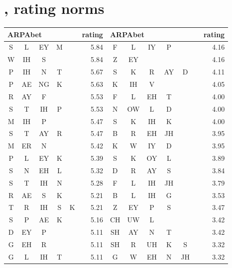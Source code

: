 \section{\citet{Albright2003b}, rating norms}

\begin{center}
\begin{longtable}{c@{ } c@{ } c@{ } c@{ } c r | c@{ } c@{ } c@{ } c@{ } c@{ } c r }
\toprule
\multicolumn{5}{l}{ARPAbet} & rating & \multicolumn{6}{l}{ARPAbet} & rating \\ 
\midrule
S  & L  & EY & M  &         & 5.84  & F  & L  & IY & P  &    &     & 4.16 \\
W  & IH & S  &    &         & 5.84  & Z  & EY &    &    &    &     & 4.16 \\
P  & IH & N  & T  &         & 5.67  & S  & K  & R  & AY & D  &     & 4.11 \\
P  & AE & NG & K  &         & 5.63  & K  & IH & V  &    &    &     & 4.05 \\
R  & AY & F  &    &         & 5.53  & F  & L  & EH & T  &    &     & 4.00 \\
S  & T  & IH & P  &         & 5.53  & N  & OW & L  & D  &    &     & 4.00 \\
M  & IH & P  &    &         & 5.47  & S  & K  & IH & K  &    &     & 4.00 \\
S  & T  & AY & R  &         & 5.47  & B  & R  & EH & JH &    &     & 3.95 \\
M  & ER & N  &    &         & 5.42  & K  & W  & IY & D  &    &     & 3.95 \\
P  & L  & EY & K  &         & 5.39  & S  & K  & OY & L  &    &     & 3.89 \\
S  & N  & EH & L  &         & 5.32  & D  & R  & AY & S  &    &     & 3.84 \\
S  & T  & IH & N  &         & 5.28  & F  & L  & IH & JH &    &     & 3.79 \\
R  & AE & S  & K  &         & 5.21  & B  & L  & IH & G  &    &     & 3.53 \\
T  & R  & IH & S  & K       & 5.21  & Z  & EY & P  & S  &    &     & 3.47 \\
S  & P  & AE & K  &         & 5.16  & CH & UW & L  &    &    &     & 3.42 \\ 
D  & EY & P  &    &         & 5.11  & SH & AY & N  & T  &    &     & 3.42 \\ 
G  & EH & R  &    &         & 5.11  & SH & R  & UH & K  & S  &     & 3.32 \\
G  & L  & IH & T  &         & 5.11  & G  & W  & EH & N  & JH &     & 3.32 \\

\end{longtable}
\end{center}
